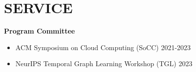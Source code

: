 \documentclass[centered,overlapped]{res}
\begin{document}
\begin{resume}
\begin{enumerate}
\end{enumerate}

\section{SERVICE}
  \textbf{Program Committee}
  \begin{itemize}  \itemsep -2pt
  \item ACM Symposium on Cloud Computing (SoCC) 2021-2023
  \item NeurIPS Temporal Graph Learning Workshop (TGL) 2023
  \end{itemize}

%


\end{resume}
\end{document}
